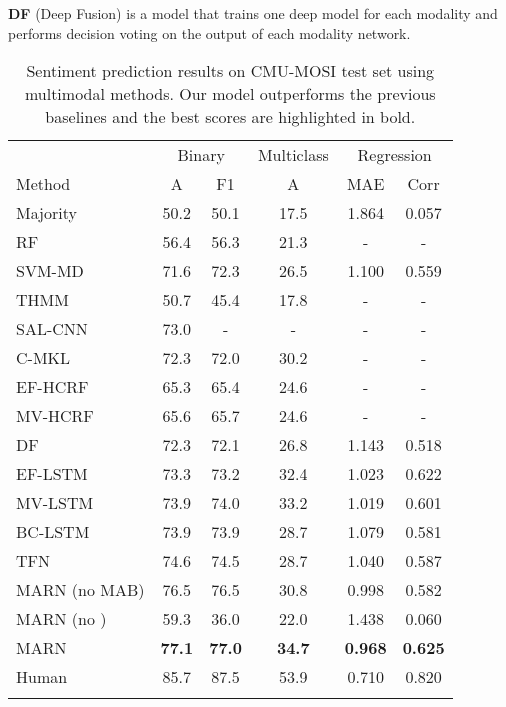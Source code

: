 \documentclass[letterpaper]{article} \usepackage{aaai18}  \usepackage{times}  \usepackage{helvet}  \usepackage{courier}  \usepackage{url}  \usepackage{graphicx}  \usepackage{multirow}
\newcommand{\pipelines}{MARN}
\begin{document}
\textbf{DF} (Deep Fusion) \cite{Nojavanasghari:2016:DMF:2993148.2993176} is a model that trains one deep model for each modality and performs decision voting on the output of each modality network. 

\begin{table}[t!]
\fontsize{7}{10}\selectfont
\centering
\setlength\tabcolsep{5.3pt}
\begin{tabular}{l c c c c c}
\Xhline{3\arrayrulewidth}
 & \multicolumn{2}{c}{{Binary}} & \multicolumn{1}{c}{{Multiclass}} & \multicolumn{2}{c}{{Regression}} \\
\cmidrule(lr{.5em}){2-3} \cmidrule(lr{.5em}){4-4} \cmidrule(lr{.5em}){5-6}
Method       & A & F1 & A & MAE & Corr\\ \Xhline{0.5\arrayrulewidth}
Majority       & 50.2 &   50.1   &	 17.5	&     1.864 &  0.057  \\
RF         & 56.4 &  56.3    &  21.3 	&		-     	&  - \\ 
SVM-MD     & 71.6 &   72.3   & 26.5  	& 1.100     &  0.559 \\ 
THMM		& 50.7	& 45.4	& 17.8& - & -\\
SAL-CNN    & 73.0 &   -      &  -	&  -        	& -\\ 
C-MKL          & 72.3 &   72.0   &  30.2	&  -       		& -\\
EF-HCRF		& 65.3 & 65.4 & 24.6 & - & -\\
MV-HCRF	& 65.6 & 65.7 & 24.6 & - & -\\
DF              & 72.3 &   72.1   &  26.8 	& 1.143     &  0.518 \\
EF-LSTM		& 73.3 &   73.2   & 32.4 &  1.023  & 0.622 \\
MV-LSTM			& 73.9 &   74.0   &   33.2	&  1.019    &  0.601 \\
BC-LSTM         & 73.9 &   73.9   &  28.7	& 1.079    	&  0.581 \\ 
TFN             & 74.6 &   74.5   &  28.7	&    1.040   	& 0.587   \\ \Xhline{0.5\arrayrulewidth}
{\pipelines } (no MAB)       	& {76.5} & {76.5} &  30.8	&  {0.998}   	& 0.582 \\ 
{\pipelines } (no )  & 59.3 & 36.0 & 22.0 & 1.438 & 0.060\\
{\pipelines }      		& \textbf{77.1}	& \textbf{77.0} & \textbf{34.7} & \textbf{0.968}  & \textbf{0.625} \\  \Xhline{0.5\arrayrulewidth}
Human                   & 85.7 &   87.5   &  53.9	&    0.710    	&  0.820  \\ \Xhline{3\arrayrulewidth}
\end{tabular}
\caption{Sentiment prediction results on CMU-MOSI test set using multimodal methods. Our model outperforms the previous baselines and the best scores are highlighted in bold.}
\label{table:mosi}
\end{table}
\end{document}
